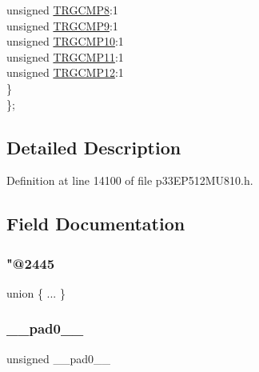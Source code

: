 \begin{DoxyCompactItemize}
\begin{tabbing}
\>\>unsigned \hyperlink{structtag_t_r_i_g1_b_i_t_s_a7d4f3ec40334f00592eb7247457e2fd6}{TRGCMP8}:1\\
\>\>unsigned \hyperlink{structtag_t_r_i_g1_b_i_t_s_a0001e7efb9031bef24e7a19100d11b0b}{TRGCMP9}:1\\
\>\>unsigned \hyperlink{structtag_t_r_i_g1_b_i_t_s_a768e63198a56962df16bcaaf9084f379}{TRGCMP10}:1\\
\>\>unsigned \hyperlink{structtag_t_r_i_g1_b_i_t_s_a8a82ad80802491f065113055f2a059e2}{TRGCMP11}:1\\
\>\>unsigned \hyperlink{structtag_t_r_i_g1_b_i_t_s_a2bc8969a57c3dbec6828f3bda9ebc1fd}{TRGCMP12}:1\\
\>\} \\
\}; \\

\end{tabbing}\end{DoxyCompactItemize}


\subsection{Detailed Description}


Definition at line 14100 of file p33\+E\+P512\+M\+U810.\+h.



\subsection{Field Documentation}
\mbox{\label{structtag_t_r_i_g1_b_i_t_s_a7b10674bd6f7ade59c1dd3e075b6cfac}} 
\subsubsection{\texorpdfstring{"@2445}{@2445}}
{\footnotesize\ttfamily union \{ ... \} }

\mbox{\label{structtag_t_r_i_g1_b_i_t_s_adf71f3d8410c1f1dbbc96680a92c49af}} 
\subsubsection{\texorpdfstring{\+\_\+\+\_\+pad0\+\_\+\+\_\+}{\_\_pad0\_\_}}
{\footnotesize\ttfamily unsigned \+\_\+\+\_\+pad0\+\_\+\+\_\+}



